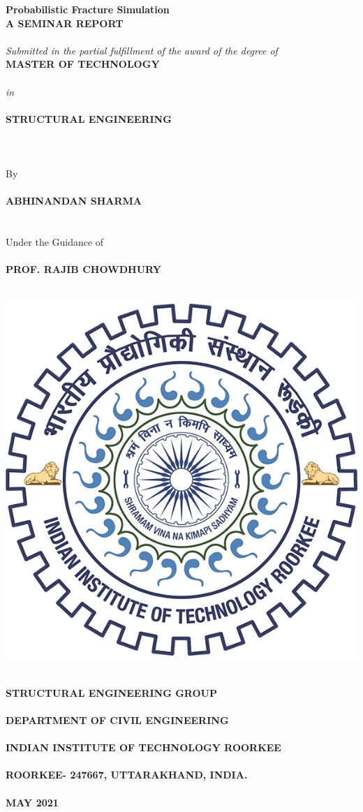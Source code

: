 \documentclass[12pt]{article}
\begin{document}
{\setmainfont{Times New Roman}
\begin{center}
    
    \vspace*{\fill}
    \textbf{\huge Probabilistic Fracture Simulation}
   \textbf{\\[.75in]\Large A SEMINAR REPORT\\~\\}
    \textit{\large Submitted in the partial fulfillment of the award of the degree of}\\[.55in]
    \textbf{\Large MASTER OF TECHNOLOGY}\\~\\\textit{\Large in}\\~\\ \textbf{\Large STRUCTURAL ENGINEERING}
    \\~\\~\\~\\{\Large By}\\~\\  \textbf{\Large ABHINANDAN SHARMA}\\~\\~\\
    Under the Guidance of
    \textbf{\\~\\\Large PROF. RAJIB CHOWDHURY}\\~\\~\\
    \includegraphics[width=.3\textwidth]{iitr.png}\\~\\~\\
    {\bf\large STRUCTURAL ENGINEERING GROUP\\~\\
DEPARTMENT OF CIVIL ENGINEERING\\~\\
INDIAN INSTITUTE OF TECHNOLOGY ROORKEE\\~\\
ROORKEE- 247667, UTTARAKHAND, INDIA.\\~\\
MAY 2021}
    \vspace*{\fill}
\end{center}
\pagebreak  

}
\end{document}

